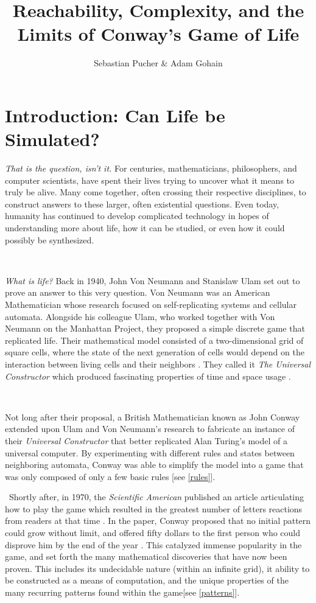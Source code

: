\documentclass{article}
\title{Reachability, Complexity, and the Limits of Conway's Game of Life}
\author{Sebastian Pucher \& Adam Gohain}
\theoremstyle{definition}
\theoremstyle{plain}
\theoremstyle{plain}
\begin{document}
\maketitle

\tableofcontents

\newpage

\section{Introduction: Can Life be Simulated?}
  \textit{    That is the question, isn't it.} For centuries, mathematicians, philosophers, and computer scientists, have spent their lives trying to uncover what it means to truly be alive. Many come together, often crossing their respective disciplines, to construct answers to these larger, often existential questions. Even today, humanity has continued to develop complicated technology in hopes of understanding more about life, how it can be studied, or even how it could possibly be synthesized.

\

\textit{What is life?} Back in 1940, John Von Neumann and Stanislaw Ulam set out to prove an answer to this very question. Von Neumann was an American Mathematician whose research focused on self-replicating systems and cellular automata. Alongside his colleague Ulam, who worked together with Von Neumann on the Manhattan Project, they proposed a simple discrete game that replicated life. Their mathematical model consisted of a two-dimensional grid of square cells, where the state of the next generation of cells would depend on the interaction between living cells and their neighbors \cite{Beginning_Life_2006}. They called it \textit{The Universal Constructor} which produced fascinating properties of time and space usage \cite{Freitas_2004}.

\

Not long after their proposal, a British Mathematician known as John Conway extended upon Ulam and Von Neumann’s research to fabricate an instance of their \textit{Universal Constructor} that better replicated Alan Turing’s model of a universal computer. By experimenting with different rules and states between neighboring automata, Conway was able to simplify the model into a game that was only composed of only a few basic rules \cite{Beginning_Life_2006} [see \ref{rules}]. 

\
Shortly after, in 1970, the \textit{Scientific American} published an article articulating how to play the game which resulted in the greatest number of letters reactions from readers at that time \cite{Izhikevich_Conway_Seth}. In the paper, Conway proposed that no initial pattern could grow without limit, and offered fifty dollars to the first person who could disprove him by the end of the year \cite{math-games}. This catalyzed immense popularity in the game, and set forth the many mathematical discoveries that have now been proven. This includes its undecidable nature (within an infinite grid), it ability to be constructed as a means of computation, and the unique properties of the many recurring patterns found within the game[see \ref{patterns}].
\end{document}
